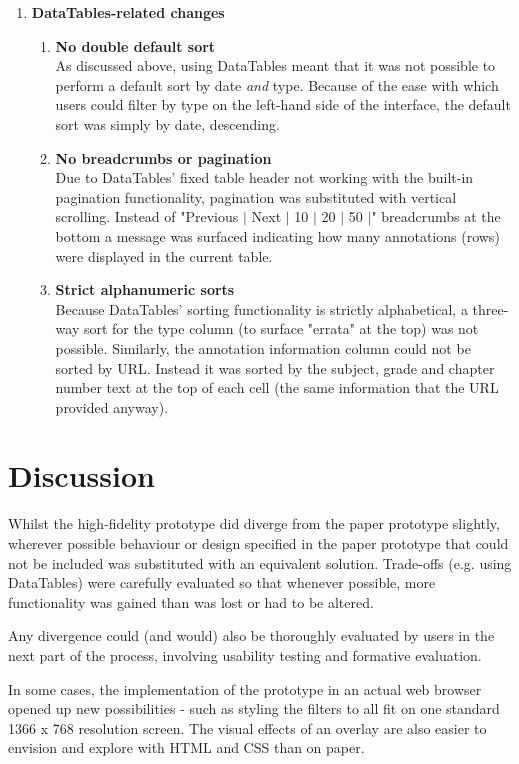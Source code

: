 \begin{enumerate}
\item \textbf{DataTables-related changes}
  \begin{enumerate}
    \item \textbf{No double default sort}\\
    As discussed above, using DataTables meant that it was not possible to perform a default sort by date \textit{and} type. Because of the ease with which users could filter by type on the left-hand side of the interface, the default sort was simply by date, descending. 
    \item \textbf{No breadcrumbs or pagination}\\
    Due to DataTables' fixed table header not working with the built-in pagination functionality, pagination was substituted with vertical scrolling. Instead of "Previous $\vert$ Next $\vert$ 10 $\vert$ 20 $\vert$ 50 $\vert$" breadcrumbs at the bottom a message was surfaced indicating how many annotations (rows) were displayed in the current table.
    \item \textbf{Strict alphanumeric sorts}\\
    Because DataTables' sorting functionality is strictly alphabetical, a three-way sort for the type column (to surface "errata" at the top) was not possible. Similarly, the annotation information column could not be sorted by URL. Instead it was sorted by the subject, grade and chapter number text at the top of each cell (the same information that the URL provided anyway). 
  \end{enumerate}
  
\end{enumerate}

\section{Discussion}
Whilst the high-fidelity prototype did diverge from the paper prototype slightly, wherever possible behaviour or design specified in the paper prototype that could not be included was substituted with an equivalent solution. Trade-offs (e.g. using DataTables) were carefully evaluated so that whenever possible, more functionality was gained than was lost or had to be altered. 

Any divergence could (and would) also be thoroughly evaluated by users in the next part of the process, involving usability testing and formative evaluation. 

In some cases, the implementation of the prototype in an actual web browser opened up new possibilities - such as styling the filters to all fit on one standard 1366 x 768 resolution screen. The visual effects of an overlay are also easier to envision and explore with HTML and CSS than on paper. 

